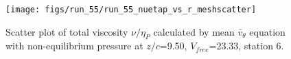 \begin{figure}[H]
\centering
\texttt{[image: figs/run\_55/run\_55\_nuetap\_vs\_r\_meshscatter]}
\caption{Scatter plot of total viscosity $\nu / \eta_P$ calculated by mean $\bar{v}_{\theta}$ equation with non-equilibrium pressure at $z/c$=9.50, $V_{free}$=23.33, station 6.}
\label{fig:run_55_nuetap_vs_r_meshscatter}
\end{figure}


